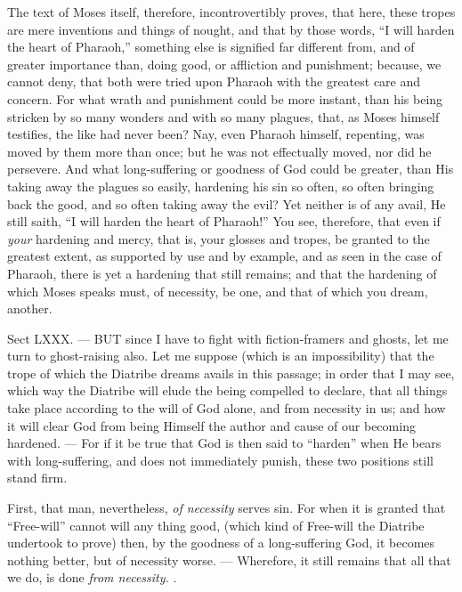 The text of Moses itself, therefore, incontrovertibly proves, that here, these tropes are mere inventions and things of nought, and that by those words, “I will harden the heart of Pharaoh,” something else is signified far different from, and of greater importance than, doing good, or affliction and punishment; because, we cannot deny, that both were tried upon Pharaoh with the greatest care and concern. For what wrath and punishment could be more instant, than his being stricken by so many wonders and with so many plagues, that, as Moses himself testifies, the like had never been? Nay, even Pharaoh himself, repenting, was moved by them more than once; but he was not effectually moved, nor did he persevere. And what long-suffering or goodness of God could be greater, than His taking away the plagues so easily, hardening his sin so often, so often bringing back the good, and so often taking away the evil? Yet neither is of any avail, He still saith, “I will harden the heart of Pharaoh!” You see, therefore, that even if \emph{your }hardening and mercy, that is, your glosses and tropes, be granted to the greatest extent, as supported by use and by example, and as seen in the case of Pharaoh, there is yet a hardening that still remains; and that the hardening of which Moses speaks must, of necessity, be one, and that of which you dream, another.


Sect LXXX. — BUT since I have to fight with fiction-framers and ghosts, let me turn to ghost-raising also. Let me suppose (which is an impossibility) that the trope of which the Diatribe dreams avails in this passage; in order that I may see, which way the Diatribe will elude the being compelled to declare, that all things take place according to the will of God alone, and from necessity in us; and how it will clear God from being Himself the author and cause of our becoming hardened. — For if it be true that God is then said to “harden” when He bears with long-suffering, and does not immediately punish, these two positions still stand firm.

First, that man, nevertheless, \emph{of necessity }serves sin. For when it is granted that “Free-will” cannot will any thing good, (which kind of Free-will the Diatribe undertook to prove) then, by the goodness of a long-suffering God, it becomes nothing better, but of necessity worse. — Wherefore, it still remains that all that we do, is done \emph{from necessity.} .

